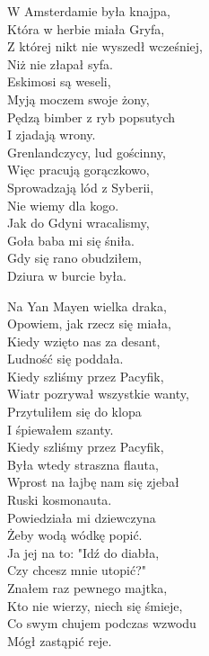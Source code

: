 \begin{multicols}{2}
W Amsterdamie była knajpa, \\
Która w herbie miała Gryfa, \\
Z której nikt nie wyszedł wcześniej, \\
Niż nie złapał syfa. \\

Eskimosi są weseli, \\
Myją moczem swoje żony, \\
Pędzą bimber z ryb popsutych\\
I zjadają wrony.\\

Grenlandczycy, lud gościnny, \\
Więc pracują gorączkowo, \\
Sprowadzają lód z Syberii, \\
Nie wiemy dla kogo.\\

Jak do Gdyni wracalismy, \\
Goła baba mi się śniła.\\
Gdy się rano obudziłem, \\
Dziura w burcie była.\\
\newcolumn

Na Yan Mayen wielka draka, \\
Opowiem, jak rzecz się miała, \\
Kiedy wzięto nas za desant, \\
Ludność się poddała.\\

Kiedy szliśmy przez Pacyfik, \\
Wiatr pozrywał wszystkie wanty, \\
Przytuliłem się do klopa\\
I śpiewałem szanty.\\

Kiedy szliśmy przez Pacyfik, \\
Była wtedy straszna flauta, \\
Wprost na łajbę nam się zjebał\\
Ruski kosmonauta.\\

Powiedziała mi dziewczyna\\
Żeby wodą wódkę popić.\\
Ja jej na to: "Idź do diabła, \\
Czy chcesz mnie utopić?"\\

Znałem raz pewnego majtka, \\
Kto nie wierzy, niech się śmieje, \\
Co swym chujem podczas wzwodu\\
Mógł zastąpić reje.\\


\end{multicols}

